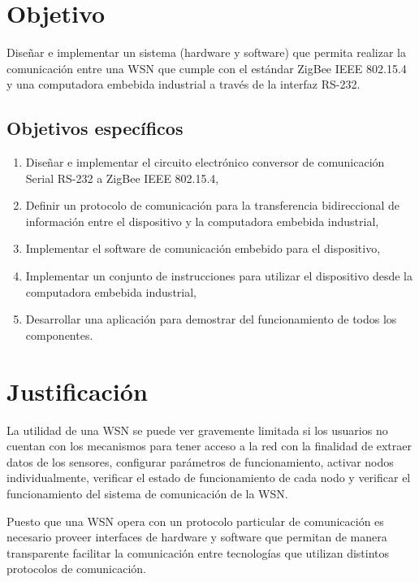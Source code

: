 
\section{Objetivo}

Diseñar e implementar un sistema (hardware y software) que permita realizar la comunicación entre una WSN que cumple con el estándar ZigBee IEEE 802.15.4 y una computadora embebida industrial a través de la interfaz RS-232. 

\subsection{Objetivos espec\'ificos}

\begin{enumerate}
	\item Diseñar e implementar el circuito electrónico conversor de comunicación Serial RS-232 a ZigBee IEEE 802.15.4,
	\item Definir un protocolo de comunicación para la transferencia bidireccional de información entre el dispositivo y la computadora embebida industrial,
	\item Implementar el software de comunicación embebido para el dispositivo, 
	\item Implementar un conjunto de instrucciones para utilizar el dispositivo desde la computadora embebida industrial, 
	\item Desarrollar una aplicación para demostrar del funcionamiento de todos los componentes. 
\end{enumerate}

\section{Justificaci\'on} 

La utilidad de una WSN se puede ver gravemente limitada si los usuarios no cuentan con los mecanismos para tener acceso a la red con la finalidad de extraer datos de los sensores, configurar parámetros de funcionamiento, activar nodos individualmente, verificar el estado de funcionamiento de cada nodo y verificar el funcionamiento del sistema de comunicación de la WSN.

Puesto que una WSN opera con un protocolo particular de comunicación es necesario proveer interfaces de hardware y software que permitan de manera transparente facilitar la comunicación entre tecnologías que utilizan distintos protocolos de comunicación.  

